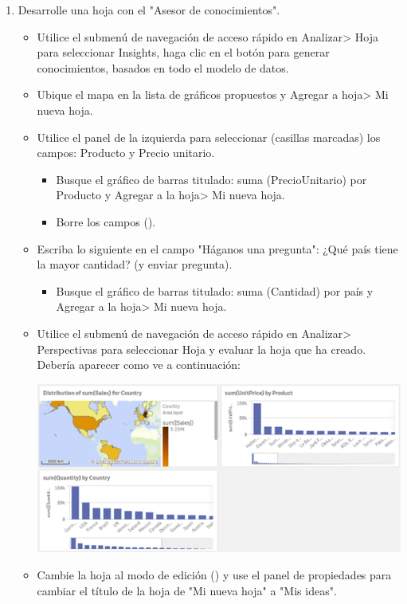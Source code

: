 \documentclass[12pt,letterpaper]{article}
\begin{document}
\begin{enumerate}
    \item Desarrolle una hoja con el "Asesor de conocimientos".\\
    \begin{itemize}
        \item Utilice el submenú de navegación de acceso rápido en Analizar> Hoja para seleccionar Insights, haga clic en el botón para generar conocimientos, basados en todo el modelo de datos.
        \item Ubique el mapa en la lista de gráficos propuestos y Agregar a hoja> Mi nueva hoja.
        \item Utilice el panel de la izquierda para seleccionar (casillas marcadas) los campos: Producto y Precio unitario.
        \begin{itemize}
            \item Busque el gráfico de barras titulado: suma (PrecioUnitario) por Producto y Agregar a la hoja> Mi nueva hoja.
            \item Borre los campos ().
        \end{itemize}
        \item Escriba lo siguiente en el campo "Háganos una pregunta": ¿Qué país tiene la mayor cantidad? (y enviar pregunta).
        \begin{itemize}
            \item Busque el gráfico de barras titulado: suma (Cantidad) por país y Agregar a la hoja> Mi nueva hoja.
        \end{itemize}
        \item Utilice el submenú de navegación de acceso rápido en Analizar> Perspectivas para seleccionar Hoja y evaluar la hoja que ha creado. Debería aparecer como ve a continuación:
        \begin{center}
            \includegraphics[width=15cm]{./img/image2.png} 
        \end{center}
        \item Cambie la hoja al modo de edición () y use el panel de propiedades para cambiar el título de la hoja de "Mi nueva hoja" a "Mis ideas".

\end{itemize}
\end{enumerate}
\end{document}
